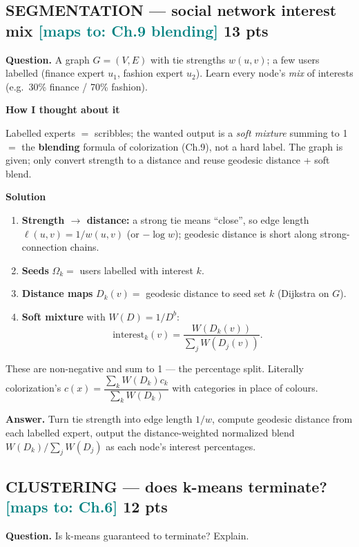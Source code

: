 \documentclass[11pt]{article}
\newcommand{\step}[1]{\smallskip\par\noindent\textbf{\textcolor{amber}{#1}}\par\nobreak}
\newcommand{\maps}[1]{{\small\textcolor{teal}{[maps to: #1]}}}
\newcommand{\ans}[1]{\begin{answer}\textbf{Answer.} #1\end{answer}}
\begin{document}
\subsection{SEGMENTATION --- social network interest mix \hfill \maps{Ch.9 blending} \hfill \textnormal{\small 13 pts}}
\begin{qbox}\textbf{Question.} A graph $G=(V,E)$ with tie strengths $w(u,v)$; a few users labelled (finance expert
$u_1$, fashion expert $u_2$). Learn every node's \emph{mix} of interests (e.g.\ 30\% finance / 70\% fashion).\end{qbox}

\step{How I thought about it}
Labelled experts $=$ scribbles; the wanted output is a \emph{soft mixture} summing to 1 $=$ the \textbf{blending}
formula of colorization (Ch.9), not a hard label. The graph is given; only convert strength to a distance and
reuse geodesic distance + soft blend.

\step{Solution}
\begin{enumerate}
  \item \textbf{Strength $\to$ distance:} a strong tie means ``close'', so edge length $\ell(u,v)=1/w(u,v)$ (or
  $-\log w$); geodesic distance is short along strong-connection chains.
  \item \textbf{Seeds} $\Omega_k=$ users labelled with interest $k$.
  \item \textbf{Distance maps} $D_k(v)=$ geodesic distance to seed set $k$ (Dijkstra on $G$).
  \item \textbf{Soft mixture} with $W(D)=1/D^b$:
  \[\text{interest}_k(v)=\frac{W(D_k(v))}{\sum_j W(D_j(v))} .\]
\end{enumerate}
These are non-negative and sum to 1 --- the percentage split. Literally colorization's
$c(x)=\dfrac{\sum_k W(D_k)c_k}{\sum_k W(D_k)}$ with categories in place of colours.
\ans{Turn tie strength into edge length $1/w$, compute geodesic distance from each labelled expert, output the
distance-weighted normalized blend $W(D_k)/\sum_j W(D_j)$ as each node's interest percentages.}

\subsection{CLUSTERING --- does k-means terminate? \hfill \maps{Ch.6} \hfill \textnormal{\small 12 pts}}
\begin{qbox}\textbf{Question.} Is k-means guaranteed to terminate? Explain.\end{qbox}
\end{document}
